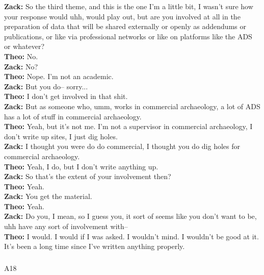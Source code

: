 \documentclass[
]{article}
\makeatletter
\let\oldsubparagraph\subparagraph
\renewcommand{\subparagraph}{
    \@ifstar
      \xxxSubParagraphStar
      \xxxSubParagraphNoStar
  }
\newcommand{\xxxSubParagraphStar}[1]{\oldsubparagraph*{#1}\mbox{}}
\newcommand{\xxxSubParagraphNoStar}[1]{\oldsubparagraph{#1}\mbox{}}
\makeatother
\begin{document}
\textbf{Zack:} So the third theme, and this is the one I'm a little bit,
I wasn't sure how your response would uhh, would play out, but are you
involved at all in the preparation of data that will be shared
externally or openly as addendums or publications, or like via
professional networks or like on platforms like the ADS or whatever?\\
\textbf{Theo:} No.\\
\textbf{Zack:} No?\\
\textbf{Theo:} Nope. I'm not an academic.\\
\textbf{Zack:} But you do-- sorry...\\
\textbf{Theo:} I don't get involved in that shit.\\
\textbf{Zack:} But as someone who, umm, works in commercial archaeology,
a lot of ADS has a lot of stuff in commercial archaeology.\\
\textbf{Theo:} Yeah, but it's not me. I'm not a supervisor in commercial
archaeology, I don't write up sites, I just dig holes.\\
\textbf{Zack:} I thought you were do do commercial, I thought you do dig
holes for commercial archaeology.\\
\textbf{Theo:} Yeah, I do, but I don't write anything up.\\
\textbf{Zack:} So that's the extent of your involvement then?\\
\textbf{Theo:} Yeah.\\
\textbf{Zack:} You get the material.\\
\textbf{Theo:} Yeah.\\
\textbf{Zack:} Do you, I mean, so I guess you, it sort of seems like you
don't want to be, uhh have any sort of involvement with--\\
\textbf{Theo:} I would. I would if I was asked. I wouldn't mind. I
wouldn't be good at it. It's been a long time since I've written
anything properly.

\subparagraph{A18}\label{sec-A18}
\end{document}
